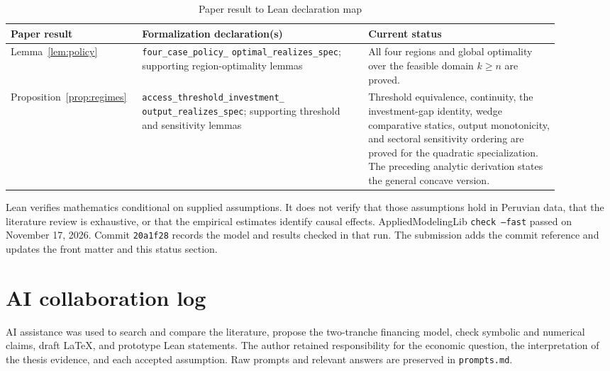\documentclass[11pt]{article}
\theoremstyle{definition}
\theoremstyle{remark}
\begin{document}
\begin{table}[H]
\centering
\footnotesize
\caption{Paper result to Lean declaration map}
\label{tab:lean}
\begin{tabular}{@{}p{0.18\linewidth}p{0.39\linewidth}p{0.33\linewidth}@{}}
\toprule
Paper result & Formalization declaration(s) & Current status \\
\midrule
Lemma~\ref{lem:policy} & \texttt{four\_case\_policy\_}\newline
\texttt{optimal\_realizes\_spec};\newline
supporting region-optimality lemmas & All four regions and global optimality
over the feasible domain $k\ge n$ are proved. \\
Proposition~\ref{prop:regimes} &
\texttt{access\_threshold\_investment\_}\newline
\texttt{output\_realizes\_spec};\newline
supporting threshold and sensitivity lemmas & Threshold equivalence,
continuity, the investment-gap identity, wedge comparative statics, output
monotonicity, and sectoral sensitivity ordering are proved for the quadratic
specialization. The preceding analytic derivation states the general concave
version. \\
\bottomrule
\end{tabular}
\end{table}

Lean verifies mathematics conditional on supplied assumptions. It does not
verify that those assumptions hold in Peruvian data, that the literature
review is exhaustive, or that the empirical estimates identify causal
effects. Applied\-Modeling\-Lib \texttt{check --fast} passed on November
17, 2026. Commit \texttt{20a1f28} records the model and results checked
in that run. The submission adds the commit reference and updates the
front matter and this status section.

\section{AI collaboration log}

AI assistance was used to search and compare the literature, propose the
two-tranche financing model, check symbolic and numerical claims, draft LaTeX,
and prototype Lean statements. The author retained responsibility for the
economic question, the interpretation of the thesis evidence, and each
accepted assumption. Raw prompts and relevant answers are preserved in
\texttt{prompts.md}.
\end{document}
